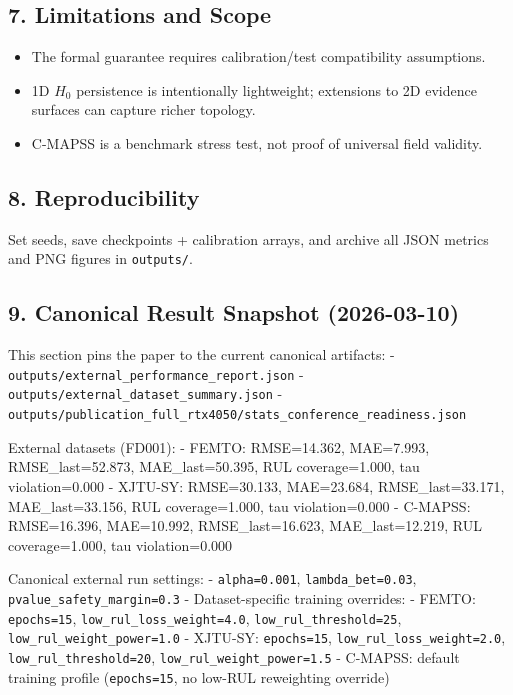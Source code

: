 \documentclass[
]{article}
\providecommand{\tightlist}{%
  \setlength{\itemsep}{0pt}\setlength{\parskip}{0pt}}
\begin{document}
\subsection{7. Limitations and Scope}\label{limitations-and-scope}

\begin{itemize}
\tightlist
\item
  The formal guarantee requires calibration/test compatibility
  assumptions.
\item
  1D \(H_0\) persistence is intentionally lightweight; extensions to 2D
  evidence surfaces can capture richer topology.
\item
  C-MAPSS is a benchmark stress test, not proof of universal field
  validity.
\end{itemize}

\subsection{8. Reproducibility}\label{reproducibility}

Set seeds, save checkpoints + calibration arrays, and archive all JSON
metrics and PNG figures in \texttt{outputs/}.

\subsection{9. Canonical Result Snapshot
(2026-03-10)}\label{canonical-result-snapshot-2026-03-10}

This section pins the paper to the current canonical artifacts: -
\texttt{outputs/external\_performance\_report.json} -
\texttt{outputs/external\_dataset\_summary.json} -
\texttt{outputs/publication\_full\_rtx4050/stats\_conference\_readiness.json}

External datasets (FD001): - FEMTO: RMSE=14.362, MAE=7.993,
RMSE\_last=52.873, MAE\_last=50.395, RUL coverage=1.000, tau
violation=0.000 - XJTU-SY: RMSE=30.133, MAE=23.684, RMSE\_last=33.171,
MAE\_last=33.156, RUL coverage=1.000, tau violation=0.000 - C-MAPSS:
RMSE=16.396, MAE=10.992, RMSE\_last=16.623, MAE\_last=12.219, RUL
coverage=1.000, tau violation=0.000

Canonical external run settings: - \texttt{alpha=0.001},
\texttt{lambda\_bet=0.03}, \texttt{pvalue\_safety\_margin=0.3} -
Dataset-specific training overrides: - FEMTO: \texttt{epochs=15},
\texttt{low\_rul\_loss\_weight=4.0}, \texttt{low\_rul\_threshold=25},
\texttt{low\_rul\_weight\_power=1.0} - XJTU-SY: \texttt{epochs=15},
\texttt{low\_rul\_loss\_weight=2.0}, \texttt{low\_rul\_threshold=20},
\texttt{low\_rul\_weight\_power=1.5} - C-MAPSS: default training profile
(\texttt{epochs=15}, no low-RUL reweighting override)
\end{document}
